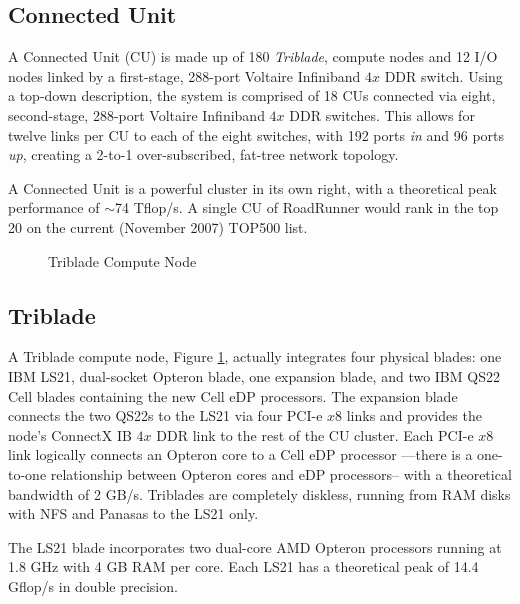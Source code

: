 \documentclass[10pt]{article}
\begin{document}
\subsection{Connected Unit}

A Connected Unit (CU) is made up of 180 \emph{Triblade}, compute
nodes and 12 I/O nodes linked by a first-stage, 288-port Voltaire
Infiniband $4x$ DDR switch.  Using a top-down description, the
system is comprised of 18 CUs connected via eight, second-stage,
288-port Voltaire Infiniband $4x$ DDR switches.  This allows for
twelve links per CU to each of the eight switches, with 192 ports
\emph{in} and 96 ports \emph{up}, creating a 2-to-1 over-subscribed,
fat-tree network topology.

A Connected Unit is a powerful cluster in its own right, with a
theoretical peak performance of $\sim$74 Tflop/s.  A single CU of
RoadRunner would rank in the top 20 on the current (November 2007)
TOP500 list.

\begin{figure}
    \begin{center}
    \caption{Triblade Compute Node}
    \label{fig:triblade}
    \end{center}
\end{figure}

\subsection{Triblade}

A Triblade compute node, Figure \ref{fig:triblade}, actually integrates
four physical blades: one IBM LS21, dual-socket Opteron blade, one
expansion blade, and two IBM QS22 Cell blades containing the new
Cell eDP processors.  The expansion blade connects the two QS22s to
the LS21 via four PCI-e $x8$ links and provides the node's
ConnectX IB $4x$ DDR link to the rest of the CU cluster.
Each PCI-e $x8$ link logically connects an Opteron core to a
Cell eDP processor ---there is a one-to-one relationship between
Opteron cores and eDP processors-- with a theoretical bandwidth
of 2 GB/s.  Triblades are completely diskless, running from RAM disks
with NFS and Panasas \cite{panasas} to the LS21 only.

The LS21 blade incorporates two dual-core AMD Opteron processors
running at 1.8 GHz with 4 GB RAM per core.  Each LS21 has a
theoretical peak of 14.4 Gflop/s in double precision.
\end{document}
